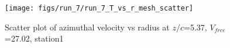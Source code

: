 \begin{figure}[H]
\centering
\texttt{[image: figs/run\_7/run\_7\_T\_vs\_r\_mesh\_scatter]}
\caption{Scatter plot of azimuthal velocity vs radius at $z/c$=5.37, $V_{free}$=27.02, station1}
\label{fig:run_7_T_vs_r_mesh_scatter}
\end{figure}


